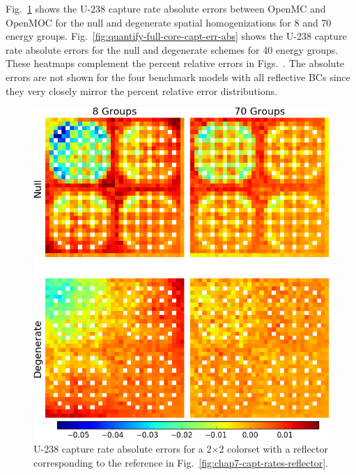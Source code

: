 \begin{appendices}
Fig.~\ref{fig:quantify-reflector-capt-err-abs} shows the U-238 capture rate absolute errors between OpenMC and OpenMOC for the null and degenerate spatial homogenizations for 8 and 70 energy groups. Fig.~\ref{fig:quantify-full-core-capt-err-abs} shows the U-238 capture rate absolute errors for the null and degenerate schemes for 40 energy groups. These heatmaps complement the percent relative errors in Figs.~. The absolute errors are not shown for the four benchmark models with all reflective \acp{BC} since they very closely mirror the percent relative error distributions.

\begin{figure}[h!]
\centering
\includegraphics[width=\linewidth]{figures/quantification/appendix/magnitude/reflector/capt-err}
\vspace{2mm}
\caption[U-238 capture rate absolute errors for a 2$\times$2 colorset with a reflector]{U-238 capture rate absolute errors for a 2$\times$2 colorset with a reflector corresponding to the reference in Fig.~\ref{fig:chap7-capt-rates-reflector}.}
\label{fig:quantify-reflector-capt-err-abs}
\end{figure}


\end{appendices}
